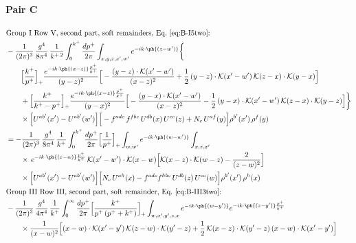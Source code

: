 \paragraph{Pair C}
\begingroup\color{pC}
\begin{align}
&\text{Group I Row V, second part, soft remainders, Eq.~\eqref{eq:B-I5two}:}\notag\\
&-\frac{1}{(2\pi)^{3}}\,\frac{g^{4}}{8\pi^{4}}\,\frac{1}{k^{+\,2}}\int_{0}^{k^{+}}\frac{dp^{+}}{2\pi}\int_{x,y,z,x',w'}e^{-ik\cdot\ph{(z-w')}}\bigg\{\notag\\
&\qquad\Big[\frac{k^{+}}{p^{+}}\Big]_{+}\frac{e^{-ik\cdot\ph{(x-z)}\frac{p^{+}}{k^{+}}}}{(y-z)^{2}}\Big[-\frac{(y-z)\cdot\mathcal{K}(x'-w')}{(x-z)^{2}}+\frac{1}{2}\,(y-z)\cdot\mathcal{K}(x'-w')\,\mathcal{K}(z-x)\cdot\mathcal{K}(y-x)\Big]\notag\\
&\qquad+\Big[\frac{k^{+}}{k^{+}-p^{+}}\Big]_{+}\frac{e^{-ik\cdot\ph{(x-z)}\frac{p^{+}}{k^{+}}}}{(y-x)^{2}}\Big[-\frac{(y-x)\cdot\mathcal{K}(x'-w')}{(x-z)^{2}}-\frac{1}{2}\,(y-x)\cdot\mathcal{K}(x'-w')\,\mathcal{K}(z-x)\cdot\mathcal{K}(y-z)\Big]\bigg\}\notag\\
&\qquad\times\Big[U^{ab'}(x')-U^{ab'}(w')\Big]\Big[-f^{adc}\,f^{fbe}\,U^{db}(x)\,U^{ce}(z)+N_{c}\,U^{af}(y)\Big]\rho^{b'}(x')\,\rho^{f}(y)\notag\\
&=-\frac{1}{(2\pi)^{3}}\,\frac{g^{4}}{8\pi^{4}}\,\frac{1}{k^{+}}\int_{0}^{k^{+}}\frac{dp^{+}}{2\pi}\Big[\frac{1}{p^{+}}\Big]_{+}\int_{w,w'}e^{-ik\cdot\ph{(w-w')}}\int_{x,z,x'}\notag\\
&\qquad\times\,e^{-ik\cdot\ph{(z-w)}\frac{p^{+}}{k^{+}}}\,\mathcal{K}(x'-w')\cdot\mathcal{K}(x-w)\Big[\mathcal{K}(x-z)\cdot\mathcal{K}(w-z)-\frac{2}{(z-w)^{2}}\Big]\notag\\
&\qquad\times\Big[U^{ab'}(x')-U^{ab'}(w')\Big]\Big[N_{c}\,U^{ah}(x)-f^{adc}f^{hbe}\,U^{db}(z)\,U^{ce}(w)\Big]\rho^{b'}(x')\,\rho^{h}(x)\notag\\
&\text{Group III Row III, second part, soft remainder, Eq.~\eqref{eq:B-III3two}:}\notag\\
&-\frac{1}{(2\pi)^{3}}\,\frac{g^{4}}{4\pi^{4}}\,\frac{1}{k^{+}}\int_{0}^{\infty}\frac{dp^{+}}{2\pi}\Big[\frac{k^{+}}{p^{+}\,(p^{+}+k^{+})}\Big]_{+}\int_{w,x',y',z,x}e^{-ik\cdot\ph{(w-y')}}e^{-ik\cdot\ph{(z-y')}\frac{p^{+}}{k^{+}}}\notag\\
&\qquad\times\frac{1}{(x-w)^{2}}\Big[(x-w)\cdot\mathcal{K}(x'-y')\,\mathcal{K}(z-w)\cdot\mathcal{K}(y'-z)+\frac{1}{2}\,\mathcal{K}(x-z)\cdot\mathcal{K}(y'-z)\,(x-w)\cdot\mathcal{K}(x'-y')\Big]\notag\\

\end{align}
